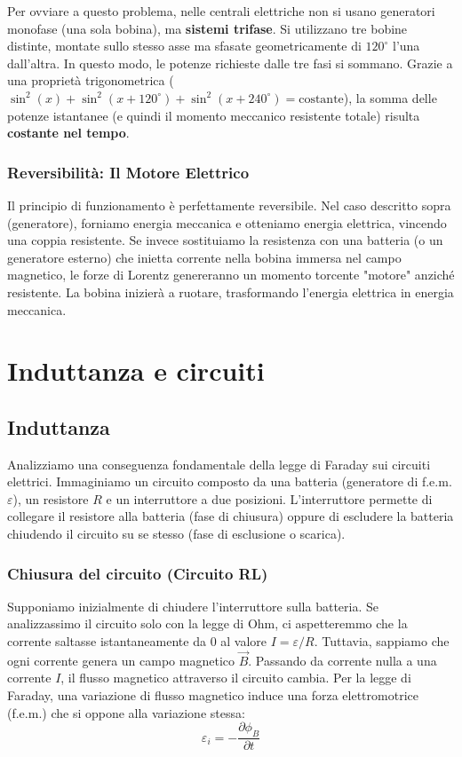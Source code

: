 \documentclass{book}
\begin{document}
Per ovviare a questo problema, nelle centrali elettriche non si usano generatori monofase (una sola bobina), ma \textbf{sistemi trifase}. Si utilizzano tre bobine distinte, montate sullo stesso asse ma sfasate geometricamente di $120^\circ$ l'una dall'altra.
In questo modo, le potenze richieste dalle tre fasi si sommano. Grazie a una proprietà trigonometrica ($\sin^2(x) + \sin^2(x+120^\circ) + \sin^2(x+240^\circ) = \text{costante}$), la somma delle potenze istantanee (e quindi il momento meccanico resistente totale) risulta \textbf{costante nel tempo}.
\subsection{Reversibilità: Il Motore Elettrico}
Il principio di funzionamento è perfettamente reversibile.
Nel caso descritto sopra (generatore), forniamo energia meccanica e otteniamo energia elettrica, vincendo una coppia resistente.
Se invece sostituiamo la resistenza con una batteria (o un generatore esterno) che inietta corrente nella bobina immersa nel campo magnetico, le forze di Lorentz genereranno un momento torcente "motore" anziché resistente. La bobina inizierà a ruotare, trasformando l'energia elettrica in energia meccanica. 



\chapter{Induttanza e circuiti}


\section{Induttanza}
Analizziamo una conseguenza fondamentale della legge di Faraday sui circuiti elettrici.
Immaginiamo un circuito composto da una batteria (generatore di f.e.m. $\varepsilon$), un resistore $R$ e un interruttore a due posizioni. L'interruttore permette di collegare il resistore alla batteria (fase di chiusura) oppure di escludere la batteria chiudendo il circuito su se stesso (fase di esclusione o scarica).

\subsection{Chiusura del circuito (Circuito RL)}
Supponiamo inizialmente di chiudere l'interruttore sulla batteria. Se analizzassimo il circuito solo con la legge di Ohm, ci aspetteremmo che la corrente saltasse istantaneamente da $0$ al valore $I = \varepsilon/R$.
Tuttavia, sappiamo che ogni corrente genera un campo magnetico $\vec{B}$. Passando da corrente nulla a una corrente $I$, il flusso magnetico attraverso il circuito cambia.
Per la legge di Faraday, una variazione di flusso magnetico induce una forza elettromotrice (f.e.m.) che si oppone alla variazione stessa:
$$\varepsilon_i = - \frac{\partial \phi_B}{\partial t}$$
\end{document}
